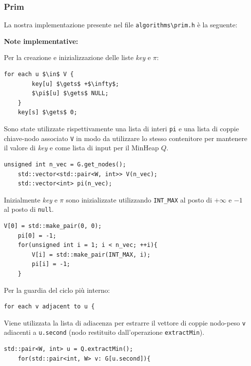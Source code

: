 \documentclass[]{article}
\begin{document}
\subsubsection{Prim}
\begin{flushleft}
	La nostra implementazione presente nel file \verb|algorithms\prim.h| è la seguente:
	
	\lstset{language=c++, style=mystyle}
	
	
	\textbf{Note implementative:}
	
	\medskip
	Per la creazione e inizializzazione delle liste \textit{key} e $\pi$:
	\begin{lstlisting}[mathescape=true]
	for each u $\in$ V {
		key[u] $\gets$ +$\infty$;
		$\pi$[u] $\gets$ NULL;
	}
	key[s] $\gets$ 0;\end{lstlisting}
	Sono state utilizzate rispettivamente una lista di interi \verb|pi| e una lista di coppie chiave-nodo associato \verb|V| in modo da utilizzare lo stesso contenitore per mantenere il valore di \textit{key} e come lista di input per il MinHeap $Q$.
	\lstset{language=c++, style=mystyle, firstnumber=2}  	 	
	\begin{lstlisting}[mathescape=true]
	unsigned int n_vec = G.get_nodes();
	std::vector<std::pair<W, int>> V(n_vec);
	std::vector<int> pi(n_vec);\end{lstlisting}
	Inizialmente \textit{key} e $\pi$ sono inizializzate utilizzando \verb|INT_MAX| al posto di $+\infty$ e $-1$ al posto di \verb|null|.
	\lstset{language=c++, style=mystyle, firstnumber=5}  	 	
	\begin{lstlisting}[mathescape=true]
	V[0] = std::make_pair(0, 0);
	pi[0] = -1;
	for(unsigned int i = 1; i < n_vec; ++i){
		V[i] = std::make_pair(INT_MAX, i);
		pi[i] = -1;
	}\end{lstlisting}
	
	Per la guardia del ciclo più interno:
	\begin{lstlisting}[mathescape=true]
	for each v adjacent to u {\end{lstlisting}
	Viene utilizzata la lista di adiacenza per estrarre il vettore di coppie nodo-peso \verb|v| adiacenti a \verb|u.second| (nodo restituito dall'operazione \verb|extractMin|).
	\lstset{language=c++, style=mystyle, firstnumber=13}  	 	
	\begin{lstlisting}[mathescape=true]
	std::pair<W, int> u = Q.extractMin();
	for(std::pair<int, W> v: G[u.second]){\end{lstlisting}
	

\end{flushleft}
\end{document}
